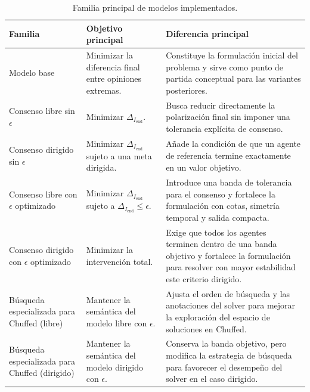 \documentclass[10pt,letterpaper]{article}
\begin{document}
\begin{table}[H]
\centering
\caption{Familia principal de modelos implementados.}
\renewcommand{\arraystretch}{1.2}
\begin{tabularx}{\linewidth}{>{\raggedright\arraybackslash}p{3.1cm} >{\raggedright\arraybackslash}p{3.2cm} Y}
\toprule
\textbf{Familia} & \textbf{Objetivo principal} & \textbf{Diferencia principal} \\
\midrule
Modelo base & Minimizar la diferencia final entre opiniones extremas. & Constituye la formulaci\'on inicial del problema y sirve como punto de partida conceptual para las variantes posteriores. \\
\addlinespace[0.5em]

Consenso libre sin \(\epsilon\) & Minimizar \(\Delta_{I_{\text{end}}}\). & Busca reducir directamente la polarizaci\'on final sin imponer una tolerancia expl\'icita de consenso. \\
\addlinespace[0.5em]

Consenso dirigido sin \(\epsilon\) & Minimizar \(\Delta_{I_{\text{end}}}\) sujeto a una meta dirigida. & A\~nade la condici\'on de que un agente de referencia termine exactamente en un valor objetivo. \\
\addlinespace[0.5em]

Consenso libre con \(\epsilon\) optimizado & Minimizar \(\Delta_{I_{\text{end}}}\) sujeto a \(\Delta_{I_{\text{end}}}\leq\epsilon\). & Introduce una banda de tolerancia para el consenso y fortalece la formulaci\'on con cotas, simetr\'ia temporal y salida compacta. \\
\addlinespace[0.5em]

Consenso dirigido con \(\epsilon\) optimizado & Minimizar la intervenci\'on total. & Exige que todos los agentes terminen dentro de una banda objetivo y fortalece la formulaci\'on para resolver con mayor estabilidad este criterio dirigido. \\
\addlinespace[0.5em]

B\'usqueda especializada para Chuffed (libre) & Mantener la sem\'antica del modelo libre con \(\epsilon\). & Ajusta el orden de b\'usqueda y las anotaciones del solver para mejorar la exploraci\'on del espacio de soluciones en Chuffed. \\
\addlinespace[0.5em]

B\'usqueda especializada para Chuffed (dirigido) & Mantener la sem\'antica del modelo dirigido con \(\epsilon\). & Conserva la banda objetivo, pero modifica la estrategia de b\'usqueda para favorecer el desempe\~no del solver en el caso dirigido. \\
\bottomrule
\end{tabularx}
\end{table}
\end{document}
